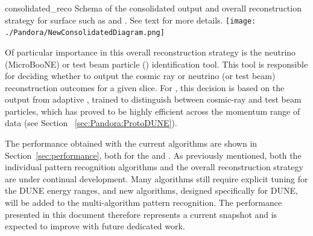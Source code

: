 \begin{dunefigure}
{consolidated_reco}
{Schema of the  consolidated output and overall reconstruction strategy for surface  such as  and . See text for more details.}
\texttt{[image: ./Pandora/NewConsolidatedDiagram.png]}
\end{dunefigure}



Of particular importance in this overall reconstruction strategy is the neutrino (MicroBooNE) or test beam particle () identification tool. This tool is responsible for deciding whether to output the cosmic ray or neutrino (or test beam) reconstruction outcomes for a given slice. For , this decision is based on the output from adaptive , trained to distinguish between cosmic-ray and test beam particles, which has proved to be highly efficient across the momentum range of  data (see Section ~\ref{sec:Pandora:ProtoDUNE}). 

The performance obtained with the current algorithms are shown in Section~\ref{sec:performance}, both for the  and .  As previously mentioned, both the individual pattern recognition algorithms and the overall reconstruction strategy are under continual development. Many algorithms %
still require explicit tuning for the DUNE energy ranges, and new algorithms, designed specifically for DUNE, will be added to the multi-algorithm pattern recognition. The performance presented in this document therefore represents a current snapshot and is expected to improve with future dedicated work. 


